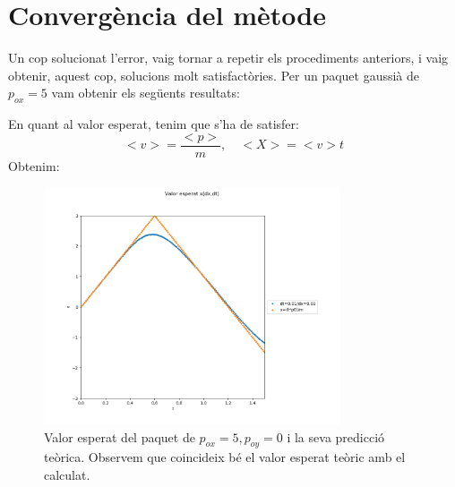 \documentclass{article}
\begin{document}
\section{Convergència del mètode}

Un cop solucionat l'error, vaig tornar a repetir els procediments anteriors, i vaig obtenir, aquest cop, solucions molt satisfactòries. Per un paquet gaussià de \(p_{ox}=5\) vam obtenir els següents resultats:

En quant al valor esperat, tenim que s'ha de satisfer:
\begin{equation}
<v>=\frac{<p>}{m}, \quad <X>=<v>t 
\end{equation}
Obtenim:
\begin{figure}[H]
	\includegraphics[width=\textwidth,height=7cm]{xespxp05dt0.png}
	\caption{Valor esperat del paquet de \(p_{ox}=5,p_{oy}=0\) i la seva predicció teòrica. Observem que coincideix bé el valor esperat teòric amb el calculat. }
\end{figure}
\end{document}
